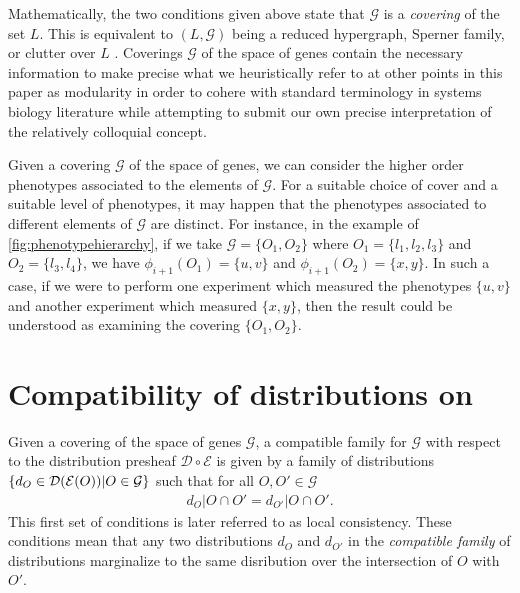 Mathematically, the two conditions given above state that $\mathcal{G}$ is a \emph{covering} of the set $L$.  This is equivalent to $(L, \mathcal{G})$ being a reduced hypergraph, Sperner family, or clutter over $L$ \cite{Lauritzen1996}.  Coverings $\mathcal{G}$ of the space of genes contain the necessary information to make precise what we heuristically refer to at other points in this paper as modularity in order to cohere with standard terminology in systems biology literature while attempting to submit our own precise interpretation of the relatively colloquial concept.

Given a covering $\mathcal{G}$ of the space of genes, we can consider the higher order phenotypes associated to the elements of $\mathcal{G}$.  For a suitable choice of cover and a suitable level of phenotypes, it may happen that the phenotypes associated to different elements of $\mathcal{G}$ are distinct.  For instance, in the example of \ref{fig:phenotypehierarchy}, if we take $\mathcal{G} = \{O_1, O_2\}$ where $O_1 = \{l_1, l_2, l_3\}$ and $O_2 = \{l_3, l_4\}$, we have $\phi_{i+1}(O_1) = \{u,v\}$ and $\phi_{i+1}(O_2) = \{x,y\}$.  In such a case, if we were to perform one experiment which measured the phenotypes $\{u,v\}$ and another experiment which measured $\{x,y\}$, then the result could be understood as examining the covering $\{O_1, O_2\}$.

\section{Compatibility of distributions on \gnpm{}}\label{sec:compatibilityofgpms}
Given a covering of the space of genes $\mathcal{G}$, a compatible family for $\mathcal{G}$ with respect to the distribution presheaf $\mathcal{D} \circ \mathcal{E}$ is given by a family of distributions $\{d_O \in \mathcal{D} (\mathcal{E}(O)) | O \in \mathcal{G}\}$ such that for all $O, O' \in \mathcal{G}$
\begin{eqnarray}\label{eq:sheafcond}
d_O|O \cap O' = d_{O'}|O \cap O'.
\end{eqnarray}
This first set of conditions is later referred to as local consistency. These conditions mean that any two distributions $d_O$ and $d_{O'}$ in the \emph{compatible family} of distributions marginalize to the same disribution over the intersection of $O$ with $O'$.

